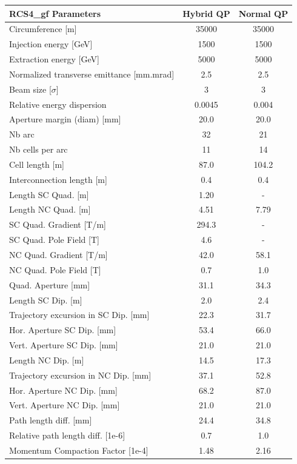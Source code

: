 \begin{tabular}{lcc}
\toprule
RCS4_gf Parameters & Hybrid QP & Normal QP \\
\midrule
Circumference [m] & 35000 & 35000 \\
Injection energy [GeV] & 1500 & 1500 \\
Extraction energy [GeV] & 5000 & 5000 \\
Normalized transverse emittance [mm.mrad] & 2.5 & 2.5 \\
Beam size [$\sigma$] & 3 & 3 \\
Relative energy dispersion & 0.0045 & 0.004 \\
Aperture margin (diam) [mm] & 20.0 & 20.0 \\
Nb arc & 32 & 21 \\
Nb cells per arc & 11 & 14 \\
Cell length [m] & 87.0 & 104.2 \\
Interconnection length [m] & 0.4 & 0.4 \\
Length SC Quad. [m] & 1.20 & - \\
Length NC Quad. [m] & 4.51 & 7.79 \\
SC Quad. Gradient [T/m] & 294.3 & - \\
SC Quad. Pole Field [T] & 4.6 & - \\
NC Quad. Gradient [T/m] & 42.0 & 58.1 \\
NC Quad. Pole Field [T] & 0.7 & 1.0 \\
Quad. Aperture [mm] & 31.1 & 34.3 \\
Length SC Dip. [m] & 2.0 & 2.4 \\
Trajectory excursion in SC Dip. [mm] & 22.3 & 31.7 \\
Hor. Aperture SC Dip. [mm] & 53.4 & 66.0 \\
Vert. Aperture SC Dip. [mm] & 21.0 & 21.0 \\
Length NC Dip. [m] & 14.5 & 17.3 \\
Trajectory excursion in NC Dip. [mm] & 37.1 & 52.8 \\
Hor. Aperture NC Dip. [mm] & 68.2 & 87.0 \\
Vert. Aperture NC Dip. [mm] & 21.0 & 21.0 \\
Path length diff. [mm] & 24.4 & 34.8 \\
Relative path length diff. [1e-6] & 0.7 & 1.0 \\
Momentum Compaction Factor [1e-4] & 1.48 & 2.16 \\
\bottomrule
\end{tabular}

